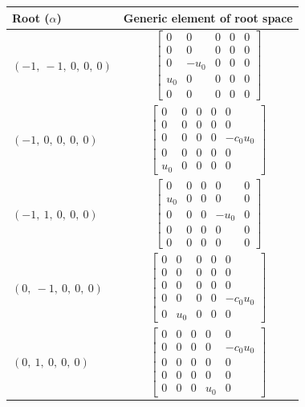 \documentclass[11pt]{article}
\theoremstyle{definition}
\begin{document}
\noindent \begin{tabular}{|l|c|}
    \hline
    \textbf{Root ($\alpha$)} & \textbf{Generic element of root space} \\
    \hline
    $\left( -1, \  -1, \  0, \  0, \  0\right)$ & $\left[\begin{matrix}0 & 0 & 0 & 0 & 0\\0 & 0 & 0 & 0 & 0\\0 & - u_{0} & 0 & 0 & 0\\u_{0} & 0 & 0 & 0 & 0\\0 & 0 & 0 & 0 & 0\end{matrix}\right]$ \\
    \hline
    $\left( -1, \  0, \  0, \  0, \  0\right)$ & $\left[\begin{matrix}0 & 0 & 0 & 0 & 0\\0 & 0 & 0 & 0 & 0\\0 & 0 & 0 & 0 & - c_{0} u_{0}\\0 & 0 & 0 & 0 & 0\\u_{0} & 0 & 0 & 0 & 0\end{matrix}\right]$ \\
    \hline
    $\left( -1, \  1, \  0, \  0, \  0\right)$ & $\left[\begin{matrix}0 & 0 & 0 & 0 & 0\\u_{0} & 0 & 0 & 0 & 0\\0 & 0 & 0 & - u_{0} & 0\\0 & 0 & 0 & 0 & 0\\0 & 0 & 0 & 0 & 0\end{matrix}\right]$ \\
    \hline
    $\left( 0, \  -1, \  0, \  0, \  0\right)$ & $\left[\begin{matrix}0 & 0 & 0 & 0 & 0\\0 & 0 & 0 & 0 & 0\\0 & 0 & 0 & 0 & 0\\0 & 0 & 0 & 0 & - c_{0} u_{0}\\0 & u_{0} & 0 & 0 & 0\end{matrix}\right]$ \\
    \hline
    $\left( 0, \  1, \  0, \  0, \  0\right)$ & $\left[\begin{matrix}0 & 0 & 0 & 0 & 0\\0 & 0 & 0 & 0 & - c_{0} u_{0}\\0 & 0 & 0 & 0 & 0\\0 & 0 & 0 & 0 & 0\\0 & 0 & 0 & u_{0} & 0\end{matrix}\right]$ \\

\end{tabular}
\end{document}
